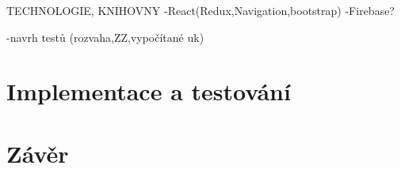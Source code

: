 TECHNOLOGIE, KNIHOVNY
-React(Redux,Navigation,bootstrap)
-Firebase?

-navrh testů (rozvaha,ZZ,vypočítané uk)

\chapter{Implementace a testování}
\chapter{Závěr}
